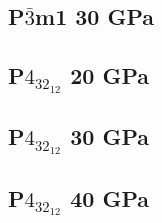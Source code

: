\documentclass[a4paper,12pt]{article}
\begin{document}
\medskip

\subsection*{P$\bar3$m1 30 GPa}


\bigskip

\subsection*{P$4_32_12$ 20 GPa}


\medskip

\subsection*{P$4_32_12$ 30 GPa}


\medskip

\subsection*{P$4_32_12$ 40 GPa}

\end{document}

